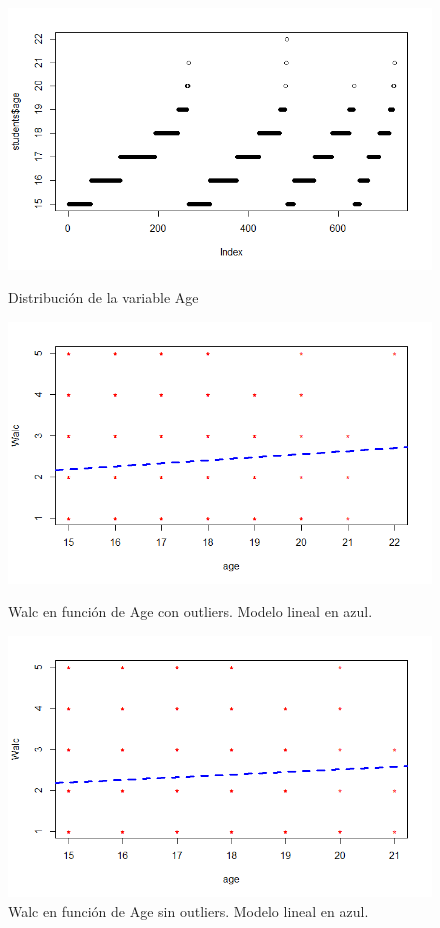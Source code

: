 \documentclass[12pt,a4paper]{article}
\begin{document}
\begin{figure}[h]
  \centering
  \begin{minipage}[b]{0.4\textwidth}
    \includegraphics[trim = 0mm 0mm 0mm 0mm, clip,scale=0.4]{images/outliers_age_1}
    \caption{Distribución de la variable Age}
  \end{minipage}
  \hfill
  \begin{minipage}[b]{0.4\textwidth}
    \includegraphics[trim = 0mm 0mm 0mm 0mm, clip,scale=0.4]{images/outliers_age_2}
    \caption{Walc en función de Age con outliers. Modelo lineal en azul.}
  \end{minipage}
  \hfill  
  \begin{minipage}[b]{0.4\textwidth}
    \includegraphics[trim = 0mm 0mm 0mm 0mm, clip,scale=0.4]{images/outliers_age_3}
    \caption{Walc en función de Age sin outliers. Modelo lineal en azul.}
  \end{minipage}
\end{figure}
\end{document}
